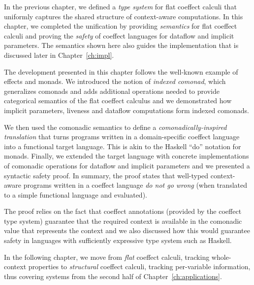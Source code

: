 In the previous chapter, we defined a \emph{type system} for flat coeffect calculi that uniformly
captures the shared structure of context-aware computations. In this chapter, we completed
the unification by providing \emph{semantics} for flat coeffect calculi and proving the
\emph{safety} of coeffect languages for dataflow and implicit parameters. The semantics shown
here also guides the implementation that is discussed later in Chapter~\ref{ch:impl}.

The development presented in this chapter follows the well-known example of effects and monads.
We introduced the notion of \emph{indexed comonad}, which generalizes comonads
and adds additional operations needed to provide categorical semantics of the flat coeffect
calculus and we demonstrated how implicit parameters, liveness and dataflow computations form
indexed comonads.

We then used the comonadic semantics to define a \emph{comonadically-inspired translation}
that turns programs written in a domain-specific coeffect language into a functional target
language. This is akin to the Haskell ``do'' notation for monads. Finally, we extended the target
language with concrete implementations of comonadic operations for dataflow and implicit parameters
and we presented a syntactic safety proof. In summary, the proof states that well-typed
context-aware programs written in a coeffect language \emph{do not go wrong} (when translated
to a simple functional language and evaluated).

The proof relies on the fact that coeffect annotations (provided by the coeffect type system)
guarantee that the required context is available in the comonadic value that represents the
context and we also discussed how this would guarantee safety in languages with sufficiently
expressive type system such as Haskell.

In the following chapter, we move from \emph{flat} coeffect calculi, tracking whole-context
properties to \emph{structural} coeffect calculi, tracking per-variable information, thus
covering systems from the second half of Chapter~\ref{ch:applications}.
